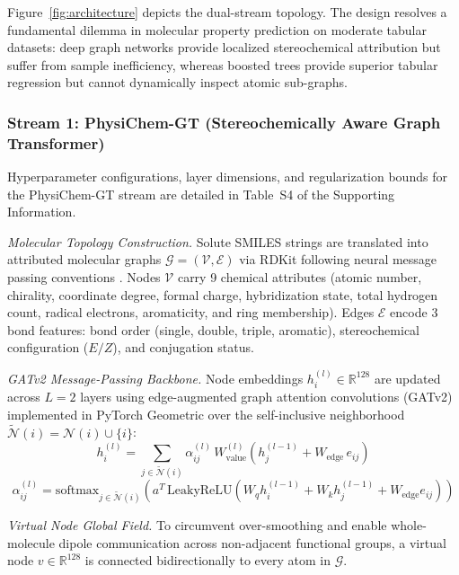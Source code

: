 \documentclass[11pt]{article}
\begin{document}
Figure~\ref{fig:architecture} depicts the dual-stream topology. The design resolves a fundamental dilemma in molecular property prediction on moderate tabular datasets: deep graph networks provide localized stereochemical attribution but suffer from sample inefficiency, whereas boosted trees provide superior tabular regression but cannot dynamically inspect atomic sub-graphs.

\subsubsection{Stream 1: PhysiChem-GT (Stereochemically Aware Graph Transformer)}
Hyperparameter configurations, layer dimensions, and regularization bounds for the PhysiChem-GT stream are detailed in Table~S4 of the Supporting Information.

\textit{Molecular Topology Construction.} Solute SMILES strings are translated into attributed molecular graphs $\mathcal{G} = (\mathcal{V}, \mathcal{E})$ via RDKit \cite{landrum2023} following neural message passing conventions \cite{gilmer2017}. Nodes $\mathcal{V}$ carry 9 chemical attributes (atomic number, chirality, coordinate degree, formal charge, hybridization state, total hydrogen count, radical electrons, aromaticity, and ring membership). Edges $\mathcal{E}$ encode 3 bond features: bond order (single, double, triple, aromatic), stereochemical configuration ($E/Z$), and conjugation status.

\textit{GATv2 Message-Passing Backbone.} Node embeddings $h_i^{(l)} \in \mathbb{R}^{128}$ are updated across $L=2$ layers using edge-augmented graph attention convolutions (GATv2) \cite{brody2022} implemented in PyTorch Geometric \cite{fey2019} over the self-inclusive neighborhood $\widetilde{\mathcal{N}}(i) = \mathcal{N}(i) \cup \{i\}$:
\begin{equation}
h_i^{(l)} = \sum_{j \in \widetilde{\mathcal{N}}(i)} \alpha_{ij}^{(l)} \, W_{\mathrm{value}}^{(l)} \left( h_j^{(l-1)} + W_{\mathrm{edge}} \, e_{ij} \right)
\label{eq:gat_update}
\end{equation}
\begin{equation}
\alpha_{ij}^{(l)} = \mathrm{softmax}_{j \in \widetilde{\mathcal{N}}(i)} \left( a^{T} \, \mathrm{LeakyReLU} \left( W_{q} h_i^{(l-1)} + W_{k} h_j^{(l-1)} + W_{\mathrm{edge}} e_{ij} \right) \right)
\label{eq:gat_attn}
\end{equation}

\textit{Virtual Node Global Field.} To circumvent over-smoothing and enable whole-molecule dipole communication across non-adjacent functional groups, a virtual node $v \in \mathbb{R}^{128}$ is connected bidirectionally to every atom in $\mathcal{G}$.
\end{document}

